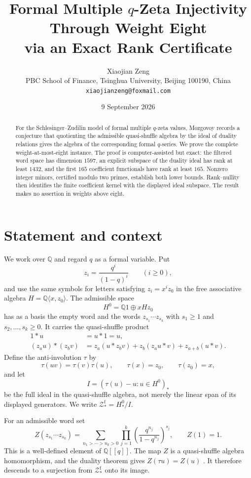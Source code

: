 \documentclass[11pt]{article}
\title{Formal Multiple \(q\)-Zeta Injectivity Through Weight Eight\\
       via an Exact Rank Certificate}
\author{Xiaojian Zeng\\
\small PBC School of Finance, Tsinghua University, Beijing 100190, China\\
\small \texttt{xiaojianzeng@foxmail.com}}
\date{9 September 2026}
\newcommand{\Q}{\mathbb{Q}}
\newcommand{\Zf}{\mathcal{Z}^{\mathrm f}_*}
\begin{document}
\maketitle

\begin{abstract}
For the Schlesinger--Zudilin model of formal multiple \(q\)-zeta values,
Mozgovoy records a conjecture that quotienting the admissible quasi-shuffle algebra by
the ideal of duality relations gives the algebra of the corresponding formal
\(q\)-series.  We prove the complete weight-at-most-eight instance.  The proof
is computer-assisted but exact: the filtered word space has dimension \(1597\),
an explicit subspace of the duality ideal has rank at least \(1432\), and the
first \(165\) coefficient functionals have rank at least \(165\).  Nonzero
integer minors, certified modulo two primes, establish both lower bounds.
Rank--nullity then identifies the finite coefficient kernel with the displayed
ideal subspace.  The result makes no assertion in weights above eight.
\end{abstract}

\section{Statement and context}

We work over \(\Q\) and regard \(q\) as a formal variable.  Put
\[
 z_i=\frac{q^i}{(1-q)^i}\qquad(i\geq 0),
\]
and use the same symbols for letters satisfying \(z_i=x^iz_0\) in the free
associative algebra \(H=\Q\langle x,z_0\rangle\).  The admissible space
\[
 H^0=\Q 1\oplus xHz_0
\]
has as a basis the empty word and the words
\(z_{s_1}\cdots z_{s_k}\) with \(s_1\geq1\) and
\(s_2,\ldots,s_k\geq0\).  It carries the quasi-shuffle product
\cite{Hoffman2000}
\begin{align*}
 1*u&=u*1=u,\\
 (z_a u)*(z_b v)
 &=z_a(u*z_bv)+z_b(z_au*v)+z_{a+b}(u*v).
\end{align*}
Define the anti-involution \(\tau\) by
\[
 \tau(uv)=\tau(v)\tau(u),\qquad \tau(x)=z_0,
 \qquad \tau(z_0)=x,
\]
and let
\[
 I=(\tau(u)-u:u\in H^0)_*
\]
be the full ideal in the quasi-shuffle algebra, not merely the linear span of
its displayed generators.  We write \(\Zf=H^0_*/I\).

For an admissible word set
\[
 Z(z_{s_1}\cdots z_{s_k})=
 \sum_{n_1>\cdots>n_k>0}
 \prod_{j=1}^k
 \left(\frac{q^{n_j}}{1-q^{n_j}}\right)^{s_j},
 \qquad Z(1)=1.
\]
This is a well-defined element of \(\Q[[q]]\).  The map \(Z\) is a
quasi-shuffle algebra homomorphism, and the duality theorem gives
\(Z(\tau u)=Z(u)\) \cite[Theorem~3.5]{Mozgovoy2026}.  It therefore descends to
a surjection from \(\Zf\) onto its image.
\end{document}
